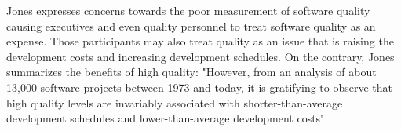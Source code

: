 Jones expresses concerns towards the poor measurement of software quality causing executives and even quality personnel to treat software quality as an expense. Those participants may also treat quality as an issue that is raising the development costs and increasing development schedules. On the contrary, Jones summarizes the benefits of high quality: "However, from an analysis of about 13,000 software projects between 1973 and today, it is gratifying to observe that high quality levels are invariably associated with shorter-than-average development schedules and lower-than-average development costs"~\cite{jones2011economics}

 
 
 
 
